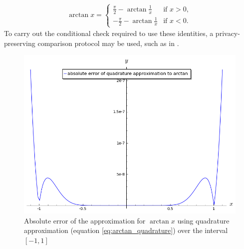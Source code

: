 \begin{align*}
	\arctan x =
	\begin{cases}
		\frac{\pi}{2}-\arctan{\frac{1}{x}} & \text{if } x > 0, \\
		-\frac{\pi}{2}-\arctan{\frac{1}{x}} & \text{if } x < 0.
	\end{cases}
\end{align*}
To carry out the conditional check required to use these identities, a privacy-preserving comparison protocol may be used, such as in \cite{veugen_improving_2012}.
\begin{figure}[!ht]
		\centering
		\includegraphics[width=.9\linewidth]{figures/arctan_error_2.png}
		\caption{Absolute error of the approximation for $\arctan x$ using quadrature approximation (equation \ref{eq:arctan_quadrature}) over the interval $[-1,1]$}
		\label{fig:arctan_error_2}
\end{figure}
